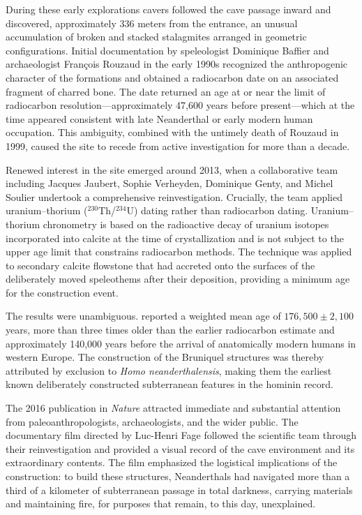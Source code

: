 \documentclass[12pt]{article}
\begin{document}
During these early explorations cavers followed the cave passage inward and discovered, approximately 336 meters from the entrance, an unusual accumulation of broken and stacked stalagmites arranged in geometric configurations. Initial documentation by speleologist Dominique Baffier and archaeologist François Rouzaud in the early 1990s recognized the anthropogenic character of the formations and obtained a radiocarbon date on an associated fragment of charred bone. The date returned an age at or near the limit of radiocarbon resolution—approximately 47,600 years before present—which at the time appeared consistent with late Neanderthal or early modern human occupation. This ambiguity, combined with the untimely death of Rouzaud in 1999, caused the site to recede from active investigation for more than a decade.

Renewed interest in the site emerged around 2013, when a collaborative team including Jacques Jaubert, Sophie Verheyden, Dominique Genty, and Michel Soulier undertook a comprehensive reinvestigation. Crucially, the team applied uranium--thorium ($^{230}$Th/$^{234}$U) dating rather than radiocarbon dating. Uranium--thorium chronometry is based on the radioactive decay of uranium isotopes incorporated into calcite at the time of crystallization and is not subject to the upper age limit that constrains radiocarbon methods. The technique was applied to secondary calcite flowstone that had accreted onto the surfaces of the deliberately moved speleothems after their deposition, providing a minimum age for the construction event.

The results were unambiguous. \citet{Jaubert2016} reported a weighted mean age of $176{,}500 \pm 2{,}100$ years, more than three times older than the earlier radiocarbon estimate and approximately 140,000 years before the arrival of anatomically modern humans in western Europe. The construction of the Bruniquel structures was thereby attributed by exclusion to \textit{Homo neanderthalensis}, making them the earliest known deliberately constructed subterranean features in the hominin record.

The 2016 publication in \textit{Nature} attracted immediate and substantial attention from paleoanthropologists, archaeologists, and the wider public. The documentary film directed by Luc-Henri Fage \citep{Fage2019} followed the scientific team through their reinvestigation and provided a visual record of the cave environment and its extraordinary contents. The film emphasized the logistical implications of the construction: to build these structures, Neanderthals had navigated more than a third of a kilometer of subterranean passage in total darkness, carrying materials and maintaining fire, for purposes that remain, to this day, unexplained.
\end{document}
